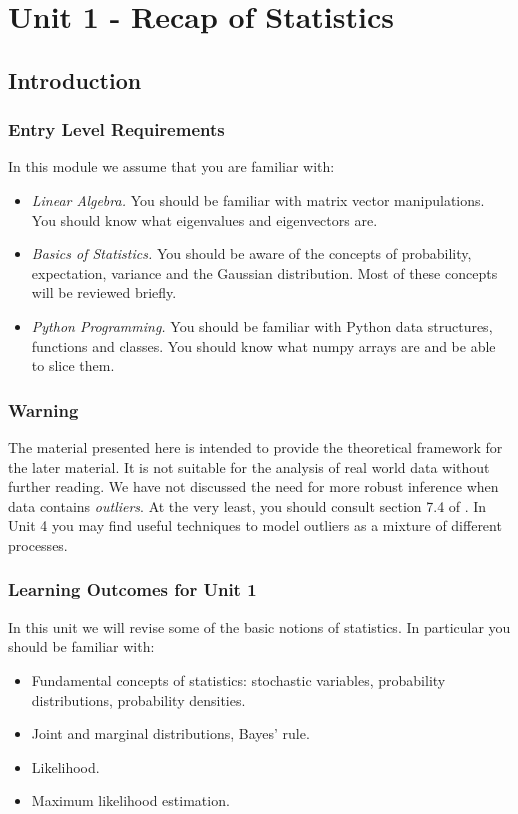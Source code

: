 \part{Unit 1 - Recap of Statistics}
\chapter{Introduction}

\section{Entry Level Requirements}
In this module we assume that you are familiar with:
\begin{itemize}
\item \emph{Linear Algebra.} You should be familiar with matrix vector manipulations.
  You should know what eigenvalues and eigenvectors are.
\item \emph{Basics of Statistics.} You should be aware of the concepts of probability,
  expectation, variance and the Gaussian distribution. Most of these concepts will
  be reviewed briefly.
\item \emph{Python Programming.} You should be familiar with Python data structures,
  functions and classes. You should know what numpy arrays are and be able to slice
  them.
\end{itemize}  

\section{Warning}
The material presented here is intended to provide the theoretical framework
for the later material. It is not suitable for the analysis of real world data without
further reading. We have not discussed the need for more robust inference
when data contains \emph{outliers}. At the very least, you should consult
section 7.4 of \cite{murphy2012}. In Unit 4 you may find useful techniques
to model outliers as a mixture of different processes.

  
\section{Learning Outcomes for Unit 1}
In this unit we will revise some of the basic notions of statistics. In particular
you should be  familiar with:

\begin{itemize}
\item Fundamental concepts of statistics: stochastic variables,
  probability distributions, probability densities.

\item Joint and marginal distributions, Bayes' rule.
\item Likelihood.
\item Maximum likelihood estimation.
\end{itemize}

